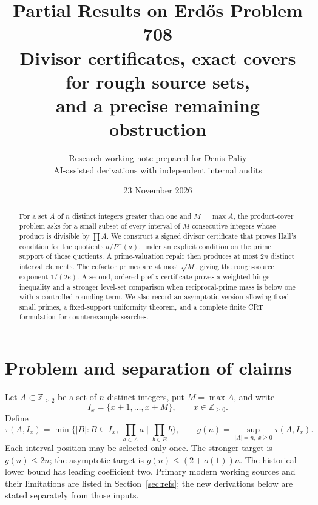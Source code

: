 \documentclass[11pt,a4paper]{article}
\title{\textbf{Partial Results on Erd\H{o}s Problem 708}\\[4pt]
\large Divisor certificates, exact covers for rough source sets,\\
and a precise remaining obstruction}
\author{Research working note prepared for Denis Paliy\\
\small AI-assisted derivations with independent internal audits}
\date{23 November 2026}
\theoremstyle{remark}
\newcommand{\ZZ}{\mathbb Z}
\begin{document}
\maketitle
\begin{center}
\end{center}
\begin{abstract}
For a set \(A\) of \(n\) distinct integers greater than one and
\(M=\max A\), the product-cover problem asks for a small subset of every
interval of \(M\) consecutive integers whose product is divisible by
\(\prod A\). We construct a signed divisor certificate that proves Hall's
condition for the quotients \(a/P^+(a)\), under an explicit condition on
the prime support of those quotients. A prime-valuation repair then
produces at most \(2n\) distinct interval elements. The cofactor primes
are at most \(\sqrt M\), giving the rough-source exponent \(1/(2e)\).
A second, ordered-prefix certificate proves a weighted hinge inequality
and a stronger level-set comparison when reciprocal-prime mass is below
one with a controlled rounding term. We also record an asymptotic
version allowing fixed small primes, a fixed-support uniformity theorem,
and a complete finite CRT formulation for counterexample searches.
\end{abstract}
\begingroup
\small
\setcounter{tocdepth}{1}
\setlength{\parskip}{1pt}
\makeatletter
\renewcommand{\l@section}[2]{\@dottedtocline{1}{0em}{2em}{#1}{#2}}
\makeatother
\tableofcontents
\endgroup
\newpage

\section{Problem and separation of claims}

Let \(A\subset\ZZ_{\ge2}\) be a set of \(n\) distinct integers, put
\(M=\max A\), and write
\[
 I_x=\{x+1,\ldots,x+M\},\qquad x\in\ZZ_{\ge0}.
\]
Define
\[
 \tau(A,I_x)=\min\{|B|:B\subseteq I_x,\ \prod_{a\in A}a\mid\prod_{b\in B}b\},
 \qquad
 g(n)=\sup_{|A|=n,\ x\ge0}\tau(A,I_x).
\]
Each interval position may be selected only once. The stronger target is
\(g(n)\le2n\); the asymptotic target is \(g(n)\le(2+o(1))n\).
The historical lower bound has leading coefficient two. Primary modern
working sources and their limitations are listed in
Section~\ref{sec:refs}; the new derivations below are stated separately
from those inputs.
\end{document}
